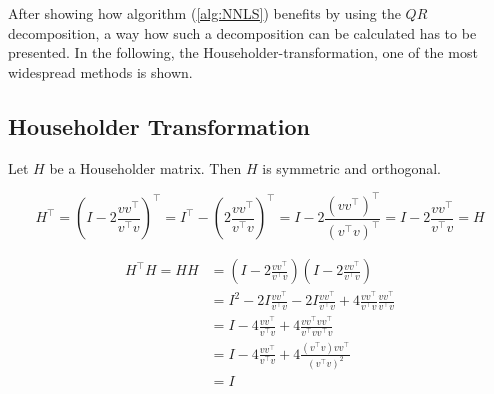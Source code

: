 After showing how algorithm (\ref{alg:NNLS}) benefits by using the $QR$ decomposition, a way how such a decomposition can be calculated has to be presented. In the following, the Householder-transformation,  one of the most widespread methods is shown.

\subsection{Householder Transformation}  

\begin{remark}
	Let $H$ be a Householder matrix. Then $H$ is symmetric and orthogonal. 
	
	\begin{equation*}
		H^\top 	= (I - 2 \frac{v v^\top}{v^\top v})^\top 
				= I^\top - \left( 2 \frac{v v^\top}{v^\top v} \right)^\top 
				= I - 2 \frac{\left( v v^\top \right)^\top}{\left( v^\top v \right)^\top} 
				= I - 2 \frac{v v^\top}{v^\top v} = H	
	\end{equation*}
	
	\begin{align*}
		H^\top H = H H 	
		& = (I - 2 \frac{v v^\top}{v^\top v}) (I - 2 \frac{v v^\top}{v^\top v}) \\
		& = I^2 - 2I \frac{v v^\top}{v^\top v} - 2I \frac{v v^\top}{v^\top v} + 4 \frac{v v^\top}{v^\top v} \frac{v v^\top}{v^\top v} \\
		& = I - 4 \frac{v v^\top}{v^\top v} + 4 \frac{v v^\top v v^\top}{v^\top v v^\top v} \\
		& = I - 4 \frac{v v^\top}{v^\top v} + 4 \frac{(v^\top v) v v^\top}{(v^\top v)^2} \\
		& = I
	\end{align*}
\end{remark}